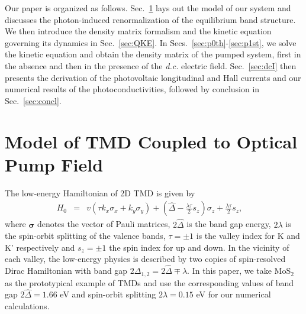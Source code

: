 \documentclass[reprint,amsmath,amssymb,aps,prb]{revtex4-1}
\begin{document}
Our paper is organized as follows. Sec.~\ref{sec:Ham} lays out the model of our system and discusses the photon-induced renormalization of the equilibrium band structure. We then introduce the density matrix formalism and the kinetic equation governing its dynamics in Sec.~\ref{sec:QKE}. In Secs.~\ref{sec:p0th}-\ref{sec:p1st}, we solve the kinetic equation and obtain the density matrix of the pumped system, first in the absence and then in the presence of the \textit{d.c.} electric field. Sec.~\ref{sec:dcI} then presents the derivation of the photovoltaic longitudinal and Hall currents and our numerical results of the photoconductivities, followed by conclusion in Sec.~\ref{sec:concl}. 

\section{Model of TMD Coupled to Optical Pump Field} \label{sec:Ham}

The low-energy Hamiltonian of 2D TMD is given by\cite{xiao2012coupled}
%
\begin{eqnarray} \label{orgham}
H_0 & =& v(\tau  k_x\sigma_x + k_y\sigma_y) +(\hat{\Delta} - \frac{\lambda \tau}{2}s_z) \sigma_z + \frac{\lambda \tau}{2} s_z, \quad \label{h0}
\end{eqnarray}
%
where  $\bm{\sigma}$ denotes the vector of Pauli matrices, $2 \hat{\Delta}$ is the band gap energy, $2\lambda$ is the spin-orbit splitting of the valence bands, $\tau = \pm 1$ is the valley index for K and K' respectively and $s_z=\pm 1 $ the spin index for up and down. In the vicinity of each valley, the low-energy physics is described by two copies of spin-resolved Dirac Hamiltonian with band gap $2\Delta_{1,2} = 2\hat{\Delta}\mp {\lambda}$. In this paper, we take MoS$_2$ as the prototypical example of TMDs and use the corresponding values \cite{xiao2012coupled} of band gap $2 \hat{\Delta} = 1.66$ eV and spin-orbit splitting $2\lambda = 0.15$ eV  for our numerical calculations. 
\end{document}
